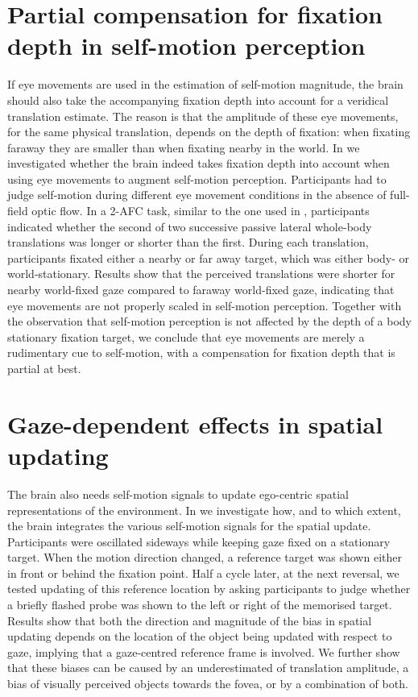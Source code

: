 \section{Partial compensation for fixation depth in self-motion perception}
If eye movements are used in the estimation of self-motion magnitude, the brain should also take the accompanying fixation depth into account for a veridical translation estimate. The reason is that the amplitude of these eye movements, for the same physical translation, depends on the depth of fixation: when fixating faraway they are smaller than when fixating nearby in the world.  In  we investigated whether the brain indeed takes fixation depth into account when using eye movements to augment self-motion perception. Participants had to judge self-motion during different eye movement conditions in the absence of full-field optic flow. In a 2-AFC task, similar to the one used in , participants indicated whether the second of two successive passive lateral whole-body translations was longer or shorter than the first. During each translation, participants fixated either a nearby or far away target, which was either body- or world-stationary. Results show that the perceived translations were shorter for nearby world-fixed gaze compared to faraway world-fixed gaze, indicating that eye movements are not properly scaled in self-motion perception. Together with the observation that self-motion perception is not affected by the depth of a body stationary fixation target, we conclude that eye movements are merely a rudimentary cue to self-motion, with a compensation for fixation depth that is partial at best.

\section{Gaze-dependent effects in spatial updating}
The brain also needs self-motion signals to update ego-centric spatial representations of the environment. In  we investigate how, and to which extent, the brain integrates the various self-motion signals for the spatial update. Participants were oscillated sideways while keeping gaze fixed on a stationary target. When the motion direction changed, a reference target was shown either in front or behind the fixation point. Half a cycle later, at the next reversal, we tested updating of this reference location by asking participants to judge whether a briefly flashed probe was shown to the left or right of the memorised target. Results show that both the direction and magnitude of the bias in spatial updating depends on the location of the object being updated with respect to gaze, implying that a gaze-centred reference frame is involved. We further show that these biases can be caused by an underestimated of translation amplitude, a bias of visually perceived objects towards the fovea, or by a combination of both.

